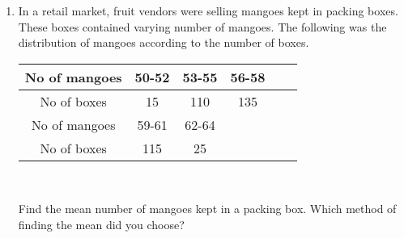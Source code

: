 \renewcommand{\theequation}{\theenumi}
\begin{enumerate}[label=\arabic*.,ref=\thesubsection.\theenumi]
	\item In a retail market, fruit vendors were selling mangoes kept in packing boxes. These
	boxes contained varying number of mangoes. The following was the distribution of
	mangoes according to the number of boxes.
	\begin{tabular}{|c|c|c|c|c|c|}
		\hline
		No of mangoes&50-52&53-55&56-58\\
		\hline
		No of boxes&15&110&135\\
		\hline
		No of mangoes&59-61&62-64&\\
		\hline
		No of boxes&115&25&\\
		\hline
	\end{tabular}\\
	\par Find the mean number of mangoes kept in a packing box. Which method of finding
	the mean did you choose?
\end{enumerate}